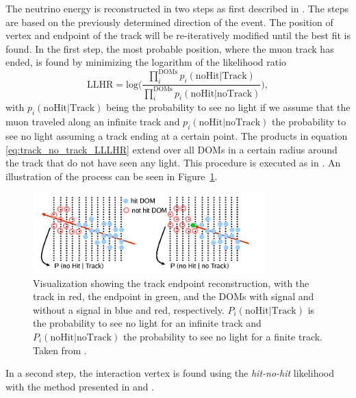 The neutrino energy is reconstructed in two steps as first described in \cite{Terliuk_masters}.
The steps are based on the previously determined direction of the event.
The position of vertex and endpoint of the track will be re-iteratively modified until the best fit is found.
In the first step, the most probable position, where the muon track has ended, is found by minimizing the logarithm of the likelihood ratio
\begin{equation}
    \mathrm{LLHR} = \mathrm{log}
    \Bigg(
    \frac
    {\prod\limits^{\mathrm{DOMs}}_ip_i(\mathrm{noHit}|\mathrm{Track})}
    {\prod\limits^{\mathrm{DOMs}}_ip_i(\mathrm{noHit}|\mathrm{noTrack})}
    \Bigg)
    ,
    \label{eq:track_no_track_LLLHR}
\end{equation}
with $p_i(\mathrm{noHit}|\mathrm{Track})$ being the probability to see no light if we assume that the muon traveled along an infinite track and $p_i(\mathrm{noHit}|\mathrm{noTrack})$ the probability to see no light assuming a track ending at a certain point.
The products in equation \ref{eq:track_no_track_LLLHR} extend    over all DOMs in a certain radius around the track that do not have seen any light. This procedure is executed as in \cite{SEuler}.
An illustration of the process can be seen in Figure~\ref{fig:finite_reco}.
\begin{figure}[h]
    \centering
      \includegraphics[width=0.8\textwidth]{figures/finiteReco_hitNoHit_track.pdf}
    \caption[Track endpoint reconstruction, taken from \cite{LEERA_internal}]{Visualization showing the track endpoint reconstruction, with the track in red, the endpoint in green, and  the DOMs with signal and without a signal in blue and red, respectively.
    $P_i(\mathrm{noHit}|\mathrm{Track})$ is the probability to see no light for an infinite track and $P_i(\mathrm{noHit}|\mathrm{noTrack})$ the probability to see no light for a finite track.
    Taken from \cite{LEERA_internal}.}
    \label{fig:finite_reco}
\end{figure}
In a second step, the interaction vertex is found using the \textit{hit-no-hit} likelihood with the method presented in \cite{Terliuk_masters} and \cite{LEERA_internal}.
